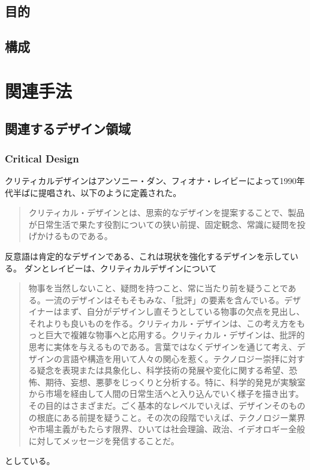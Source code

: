 \documentclass{jsarticle}
\begin{document}
\newpage
\subsection{目的}
\newpage
\subsection{構成}


\newpage
\section{関連手法}
\subsection{関連するデザイン領域}

\subsubsection{Critical Design}
クリティカルデザインはアンソニー・ダン、フィオナ・レイビーによって1990年代半ばに提唱され、以下のように定義された。
\begin{quotation}
  クリティカル・デザインとは、思索的なデザインを提案することで、製品が日常生活で果たす役割についての狭い前提、固定観念、常識に疑問を投げかけるものである。
\end{quotation}
反意語は肯定的なデザインである、これは現状を強化するデザインを示している。
ダンとレイビーは、クリティカルデザインについて
\begin{quotation}
  物事を当然しないこと、疑問を持つこと、常に当たり前を疑うことである。一流のデザインはそもそもみな、「批評」の要素を含んでいる。デザイナーはまず、自分がデザインし直そうとしている物事の欠点を見出し、それよりも良いものを作る。クリティカル・デザインは、この考え方をもっと巨大で複雑な物事へと応用する。クリティカル・デザインは、批評的思考に実体を与えるものである。言葉ではなくデザインを通じて考え、デザインの言語や構造を用いて人々の関心を惹く。テクノロジー崇拝に対する疑念を表現または具象化し、科学技術の発展や変化に関する希望、恐怖、期待、妄想、悪夢をじっくりと分析する。特に、科学的発見が実験室から市場を経由して人間の日常生活へと入り込んでいく様子を描き出す。その目的はさまざまだ。ごく基本的なレベルでいえば、デザインそのものの根底にある前提を疑うこと。その次の段階でいえば、テクノロジー業界や市場主義がもたらす限界、ひいては社会理論、政治、イデオロギー全般に対してメッセージを発信することだ。
\end{quotation}
としている。

\newpage
\end{document}
